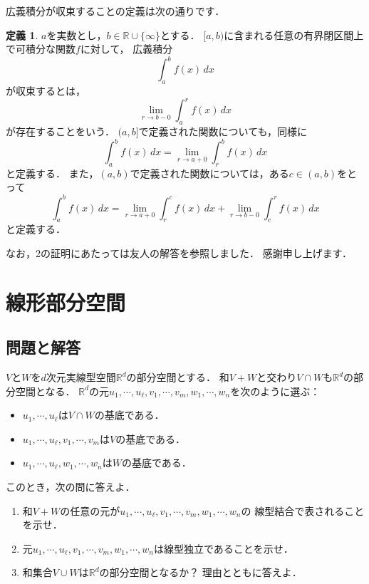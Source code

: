 \documentclass{jsarticle}
\theoremstyle{definition}
\newtheorem{defi}{定義}[section]
\begin{document}
広義積分が収束することの定義は次の通りです．
\begin{defi}
$a$を実数とし，$b\in\mathbb{R}\cup\{\infty\}$とする．
$[a,b)$に含まれる任意の有界閉区間上で可積分な関数$f$に対して，
広義積分
\[ \int_a^bf(x)\,dx \]
が収束するとは，
\[ \lim_{r\to b-0}\int_a^rf(x)\,dx \]
が存在することをいう．
$(a,b]$で定義された関数についても，同様に
\[ \int_a^bf(x)\,dx=\lim_{r\to a+0}\int_r^bf(x)\,dx \]
と定義する．
また，$(a,b)$で定義された関数については，ある$c\in(a,b)$をとって
\[ \int_a^bf(x)\,dx=\lim_{r\to a+0}\int_r^cf(x)\,dx+\lim_{r\to b-0}\int_c^rf(x)\,dx \]
と定義する．
\end{defi}

なお，2の証明にあたっては友人の解答を参照しました．
感謝申し上げます．

\section{線形部分空間}
\subsection{問題と解答}

\begin{screen}
$V$と$W$を$d$次元実線型空間$\mathbb{R}^d$の部分空間とする．
和$V+W$と交わり$V\cap W$も$\mathbb{R}^d$の部分空間となる．
$\mathbb{R}^d$の元$u_1,\cdots,u_\ell,v_1,\cdots,v_m,w_1,\cdots,w_n$を次のように選ぶ：
\begin{itemize}
\item$u_1,\cdots,u_\ell$は$V\cap W$の基底である．
\item$u_1,\cdots,u_\ell,v_1,\cdots,v_m$は$V$の基底である．
\item$u_1,\cdots,u_\ell,w_1,\cdots,w_n$は$W$の基底である．
\end{itemize}
このとき，次の問に答えよ．
\begin{enumerate}
\item 和$V+W$の任意の元が$u_1,\cdots,u_\ell,v_1,\cdots,v_m,w_1,\cdots,w_n$の
線型結合で表されることを示せ．
\item 元$u_1,\cdots,u_\ell,v_1,\cdots,v_m,w_1,\cdots,w_n$は線型独立であることを示せ．
\item 和集合$V\cup W$は$\mathbb{R}^d$の部分空間となるか？
理由とともに答えよ．
\end{enumerate}
\end{screen}
\end{document}
